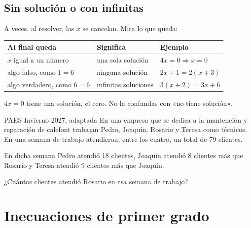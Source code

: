 \subsection{Sin solución o con infinitas}
A veces, al resolver, las $x$ se cancelan. Mira lo que queda:
\begin{center}
\begin{tabular}{@{}lll@{}}
\toprule
Al final queda & Significa & Ejemplo\\ \midrule
$x$ igual a un número & una sola solución & $4x = 0 \Rightarrow x = 0$\\
algo falso, como $1 = 6$ & ninguna solución & $2x + 1 = 2(x + 3)$\\
algo verdadero, como $6 = 6$ & infinitas soluciones & $3(x + 2) = 3x + 6$\\ \bottomrule
\end{tabular}
\end{center}
\begin{ojo}[x = 0 sí es una solución] $4x = 0$ tiene una solución, el cero. No la confundas con «no tiene solución».\end{ojo}

\begin{elejemplo}{PAES Invierno 2027, adaptada}
En una empresa que se dedica a la mantención y reparación de calefont trabajan Pedro, Joaquín, Rosario y Teresa como técnicos. En una semana de trabajo atendieron, entre los cuatro, un total de 79 clientes.

En dicha semana Pedro atendió 18 clientes, Joaquín atendió 8 clientes más que Rosario y Teresa atendió 9 clientes más que Joaquín.

¿Cuántos clientes atendió Rosario en esa semana de trabajo?
\end{elejemplo}

\section{Inecuaciones de primer grado}


